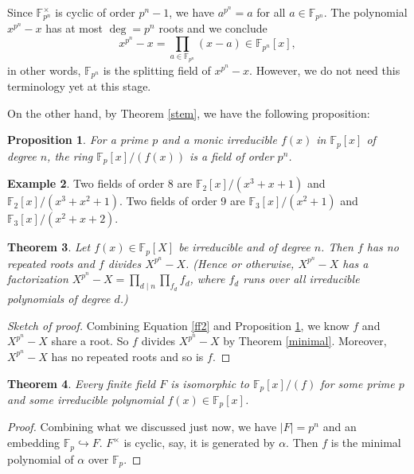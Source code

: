 \documentclass[12pt]{report}
\newtheorem{thm}{Theorem}[section]
\newtheorem{prop}[thm]{Proposition}
{\theoremstyle{remark}\newtheorem*{remark}{Remark}}
\theoremstyle{definition}
\newtheorem{example}[thm]{Example}
\def\FF{\mathbb{F}}
\def\aa{\alpha}
\begin{document}
Since $\FF_{p^n}^\times$ is cyclic of order $p^n-1$, we have $a^{p^n} = a$ for all $a\in \FF_{p^n}$. The polynomial $x^{p^n}-x$ has at most $\deg =  p^n$ roots and we conclude 
\begin{equation}\label{ff2}
    x^{p^n}-x = \prod_{a\in \FF_{p^n}} (x-a) \in \FF_{p^n}[x],
\end{equation}
in other words, $\FF_{p^n}$ is the splitting field of $x^{p^n}-x$. However, we do not need this terminology yet at this stage.


On the other hand, by Theorem \ref{stem}, we have the following proposition:

\begin{prop}\label{ff3}
    For a prime $p$ and a monic irreducible $f(x)$ in $\FF_p[x]$ of degree $n$, the ring $\FF_p[x]/(f(x))$ is a field of order $p^n$.
\end{prop}

\begin{example}
    Two fields of order 8 are $\FF_2[x]/(x^3+x+1)$ and $\FF_2[x]/(x^3+x^2+1)$. Two fields of order 9 are $\FF_3[x]/(x^2+1)$ and $\FF_3[x]/(x^2+x+2)$. 
\end{example}

\begin{thm}\label{ff1}
    Let $f(x)\in \FF_p[X]$ be irreducible and of degree $n$. Then $f$ has no repeated roots and $f$ divides $X^{p^n}-X$. (Hence or otherwise, $X^{p^n} -X$ has a factorization $X^{p^n}-X =  \prod_{d\mid n}\prod_{f_d} f_d$, where $f_d$ runs over all irreducible polynomials of degree $d$.)
\end{thm}

\begin{proof}[Sketch of proof]
    Combining Equation \ref{ff2} and Proposition \ref{ff3}, we know $f$ and $X^{p^n}-X$ share a root. So $f$ divides $X^{p^n}-X$ by Theorem \ref{minimal}. Moreover, $X^{p^n}-X$ has no repeated roots and so is $f$. 
\end{proof}

\begin{thm}
    Every finite field $F$ is isomorphic to $\FF_p[x]/(f)$ for some prime $p$ and some irreducible polynomial $f(x)\in \FF_p[x]$.
\end{thm}

\begin{proof}
    Combining what we discussed just now, we have $|F|=p^n$ and an embedding $\FF_p \hookrightarrow F$.
    $F^\times$ is cyclic, say, it is generated by $\aa$. Then $f$ is the minimal polynomial of $\aa$ over $\FF_p$.
\end{proof}
\end{document}
